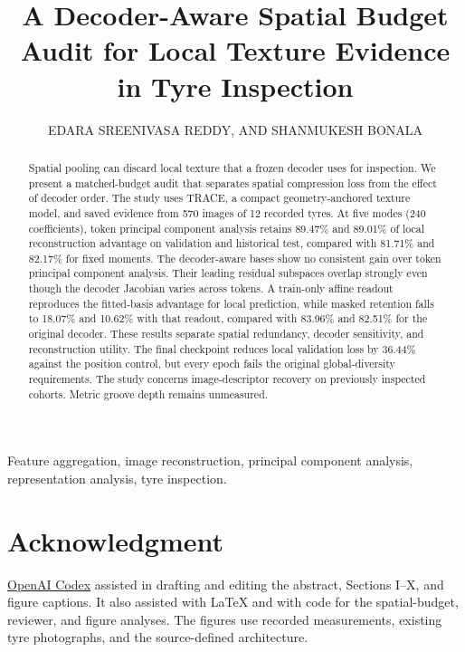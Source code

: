 \documentclass[nolineno]{ieeeaccess}
\begin{document}
\raggedbottom
\pagestyle{headings}
\history{}
\doi{}
\title{A Decoder-Aware Spatial Budget Audit for Local Texture Evidence in Tyre Inspection}
\author{\uppercase{Edara Sreenivasa Reddy}, AND
\uppercase{Shanmukesh Bonala}}
\address[1]{School of Computer Science and Engineering, VIT-AP University, Amaravati, India (e-mail: sreenivasareddy.e@vitap.ac.in)}
\address[2]{School of Computer Science and Engineering, VIT-AP University, Amaravati, India (e-mail: shanmukesh.23BCE20070@vitapstudent.ac.in)}
\begin{abstract}
Spatial pooling can discard local texture that a frozen decoder uses for inspection. We present a matched-budget audit that separates spatial compression loss from the effect of decoder order. The study uses TRACE, a compact geometry-anchored texture model, and saved evidence from 570 images of 12 recorded tyres. At five modes (240 coefficients), token principal component analysis retains 89.47\% and 89.01\% of local reconstruction advantage on validation and historical test, compared with 81.71\% and 82.17\% for fixed moments. The decoder-aware bases show no consistent gain over token principal component analysis. Their leading residual subspaces overlap strongly even though the decoder Jacobian varies across tokens. A train-only affine readout reproduces the fitted-basis advantage for local prediction, while masked retention falls to 18.07\% and 10.62\% with that readout, compared with 83.96\% and 82.51\% for the original decoder. These results separate spatial redundancy, decoder sensitivity, and reconstruction utility. The final checkpoint reduces local validation loss by 36.44\% against the position control, but every epoch fails the original global-diversity requirements. The study concerns image-descriptor recovery on previously inspected cohorts. Metric groove depth remains unmeasured.
\end{abstract}
\begin{keywords}
Feature aggregation, image reconstruction, principal component analysis, representation analysis, tyre inspection.
\end{keywords}
\titlepgskip=-21pt
\maketitle










\FloatBarrier
\section*{Acknowledgment}
\href{https://openai.com/codex/}{OpenAI Codex} assisted in drafting and editing the abstract, Sections I--X, and figure captions. It also assisted with LaTeX and with code for the spatial-budget, reviewer, and figure analyses. The figures use recorded measurements, existing tyre photographs, and the source-defined architecture.



\EOD
\end{document}
